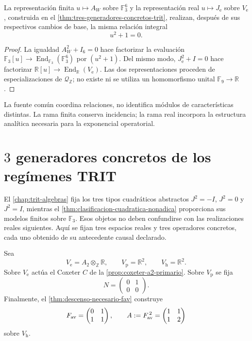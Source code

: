 \begin{theorem}
\label{thm:dos-realizaciones-fuente-cuadratica-rev3}
La representación finita \(u\mapsto A_W\) sobre
\(\mathbb F_3^6\) y la representación real \(u\mapsto J_{\mathrm e}\) sobre
\(V_{\mathrm e}\), construida en el
\cref{thm:tres-generadores-concretos-trit}, realizan, después de sus
respectivos cambios de base, la misma relación integral
\[
 u^2+1=0.
\]
\end{theorem}

\begin{proof}
La igualdad \(A_W^2+I_6=0\) hace factorizar la evaluación
\(\mathbb F_3[u]\to\operatorname{End}_{\mathbb F_3}(\mathbb F_3^6)\) por
\((u^2+1)\). Del mismo modo, \(J_{\mathrm e}^2+I=0\) hace factorizar
\(\mathbb R[u]\to\operatorname{End}_{\mathbb R}(V_{\mathrm e})\). Las dos
representaciones proceden de especializaciones de
\(\mathcal Q_{\mathbb Z}\); no existe ni se utiliza un homomorfismo unital
\(\mathbb F_9\to\mathbb R\).
\end{proof}

La fuente común coordina relaciones, no identifica módulos de
características distintas. La rama finita conserva incidencia; la rama real
incorpora la estructura analítica necesaria para la exponencial operatorial.

\section{\(3\) generadores concretos de los regímenes TRIT}
\label{sec:tres-generadores-concretos-trit}

El \cref{chap:trit-algebras} fija los tres tipos cuadráticos abstractos
\(J^2=-I\), \(J^2=0\) y \(J^2=I\), mientras el
\cref{thm:clasificacion-cuadratica-nonadica} proporciona sus modelos finitos
sobre \(\mathbb F_3\). Esos objetos no deben confundirse con las
realizaciones reales siguientes. Aquí se fijan tres espacios reales y tres
operadores concretos, cada uno obtenido de su antecedente causal declarado.

Sea
\[
V_{\mathrm e}=A_2\otimes_{\mathbb Z}\mathbb R,
\qquad
V_{\mathrm p}=\mathbb R^2,
\qquad
V_{\mathrm h}=\mathbb R^2.
\]
Sobre \(V_{\mathrm e}\) actúa el Coxeter \(C\) de la
\cref{prop:coxeter-a2-primario}. Sobre \(V_{\mathrm p}\) se fija
\[
N=
\begin{pmatrix}
0&1\\
0&0
\end{pmatrix}.
\]
Finalmente, el \cref{thm:descenso-necesario-fav} construye
\[
F_{\rm av}=
\begin{pmatrix}
0&1\\
1&1
\end{pmatrix},
\qquad
A:=F_{\rm av}^{\,2}=
\begin{pmatrix}
1&1\\
1&2
\end{pmatrix}
\]
sobre \(V_{\mathrm h}\).

